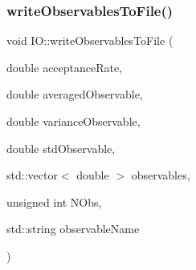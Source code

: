 \mbox{\label{namespace_i_o_ad8cf5aef8f60d10b80292b69a091d5ac}} 
\subsubsection{\texorpdfstring{writeObservablesToFile()}{writeObservablesToFile()}}
{\footnotesize\ttfamily void I\+O\+::write\+Observables\+To\+File (\begin{DoxyParamCaption}\item[{double}]{acceptance\+Rate,  }\item[{double}]{averaged\+Observable,  }\item[{double}]{variance\+Observable,  }\item[{double}]{std\+Observable,  }\item[{std\+::vector$<$ double $>$}]{observables,  }\item[{unsigned int}]{N\+Obs,  }\item[{std\+::string}]{observable\+Name }\end{DoxyParamCaption})}

